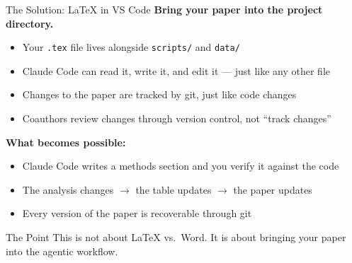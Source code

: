 \documentclass[aspectratio=169, 11pt]{beamer}
\begin{document}
\begin{frame}{The Solution: \LaTeX{} in VS Code}
  \textbf{Bring your paper into the project directory.}

  \vspace{0.8em}
  \begin{itemize}
    \item Your \texttt{.tex} file lives alongside \texttt{scripts/} and \texttt{data/}
    \item Claude Code can read it, write it, and edit it --- just like any other file
    \item Changes to the paper are tracked by git, just like code changes
    \item Coauthors review changes through version control, not ``track changes''
  \end{itemize}

  \vspace{0.8em}
  \textbf{What becomes possible:}
  \begin{itemize}
    \item Claude Code writes a methods section and you verify it against the code
    \item The analysis changes $\rightarrow$ the table updates $\rightarrow$ the paper updates
    \item Every version of the paper is recoverable through git
  \end{itemize}

  \vspace{0.5em}
  \begin{block}{The Point}
    This is not about \LaTeX{} vs.\ Word. It is about bringing your paper into the agentic workflow.
  \end{block}
\end{frame}
\end{document}
